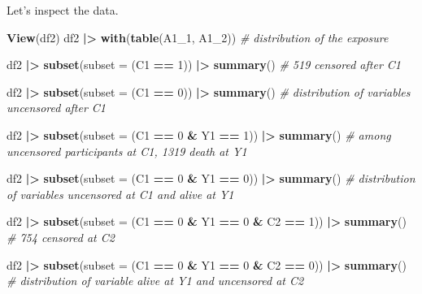 \documentclass[
]{book}
\newenvironment{Shaded}{\begin{snugshade}}{\end{snugshade}}
\newcommand{\AttributeTok}[1]{\textcolor[rgb]{0.13,0.29,0.53}{#1}}
\newcommand{\CommentTok}[1]{\textcolor[rgb]{0.56,0.35,0.01}{\textit{#1}}}
\newcommand{\DecValTok}[1]{\textcolor[rgb]{0.00,0.00,0.81}{#1}}
\newcommand{\FunctionTok}[1]{\textcolor[rgb]{0.13,0.29,0.53}{\textbf{#1}}}
\newcommand{\NormalTok}[1]{#1}
\newcommand{\SpecialCharTok}[1]{\textcolor[rgb]{0.81,0.36,0.00}{\textbf{#1}}}
\begin{document}
Let's inspect the data.

\begin{Shaded}
\begin{Highlighting}[]
\FunctionTok{View}\NormalTok{(df2)}
\NormalTok{df2 }\SpecialCharTok{|\textgreater{}} 
  \FunctionTok{with}\NormalTok{(}\FunctionTok{table}\NormalTok{(A1\_1, A1\_2)) }\CommentTok{\# distribution of the exposure}

\NormalTok{df2 }\SpecialCharTok{|\textgreater{}} 
  \FunctionTok{subset}\NormalTok{(}\AttributeTok{subset =}\NormalTok{ (C1 }\SpecialCharTok{==} \DecValTok{1}\NormalTok{)) }\SpecialCharTok{|\textgreater{}}
  \FunctionTok{summary}\NormalTok{() }\CommentTok{\# 519 censored after C1}

\NormalTok{df2 }\SpecialCharTok{|\textgreater{}} 
  \FunctionTok{subset}\NormalTok{(}\AttributeTok{subset =}\NormalTok{ (C1 }\SpecialCharTok{==} \DecValTok{0}\NormalTok{)) }\SpecialCharTok{|\textgreater{}}
  \FunctionTok{summary}\NormalTok{() }\CommentTok{\# distribution of variables uncensored after C1}

\NormalTok{df2 }\SpecialCharTok{|\textgreater{}} 
  \FunctionTok{subset}\NormalTok{(}\AttributeTok{subset =}\NormalTok{ (C1 }\SpecialCharTok{==} \DecValTok{0} \SpecialCharTok{\&}\NormalTok{ Y1 }\SpecialCharTok{==} \DecValTok{1}\NormalTok{)) }\SpecialCharTok{|\textgreater{}}
  \FunctionTok{summary}\NormalTok{() }\CommentTok{\# among uncensored participants at C1, 1319 death at Y1}

\NormalTok{df2 }\SpecialCharTok{|\textgreater{}} 
  \FunctionTok{subset}\NormalTok{(}\AttributeTok{subset =}\NormalTok{ (C1 }\SpecialCharTok{==} \DecValTok{0} \SpecialCharTok{\&}\NormalTok{ Y1 }\SpecialCharTok{==} \DecValTok{0}\NormalTok{)) }\SpecialCharTok{|\textgreater{}}
  \FunctionTok{summary}\NormalTok{() }\CommentTok{\# distribution of variables uncensored at C1 and alive at Y1}
            

\NormalTok{df2 }\SpecialCharTok{|\textgreater{}} 
  \FunctionTok{subset}\NormalTok{(}\AttributeTok{subset =}\NormalTok{ (C1 }\SpecialCharTok{==} \DecValTok{0} \SpecialCharTok{\&}\NormalTok{ Y1 }\SpecialCharTok{==} \DecValTok{0} \SpecialCharTok{\&}\NormalTok{ C2 }\SpecialCharTok{==} \DecValTok{1}\NormalTok{)) }\SpecialCharTok{|\textgreater{}}
  \FunctionTok{summary}\NormalTok{() }\CommentTok{\# 754 censored at C2}

\NormalTok{df2 }\SpecialCharTok{|\textgreater{}} 
  \FunctionTok{subset}\NormalTok{(}\AttributeTok{subset =}\NormalTok{ (C1 }\SpecialCharTok{==} \DecValTok{0} \SpecialCharTok{\&}\NormalTok{ Y1 }\SpecialCharTok{==} \DecValTok{0} \SpecialCharTok{\&}\NormalTok{ C2 }\SpecialCharTok{==} \DecValTok{0}\NormalTok{)) }\SpecialCharTok{|\textgreater{}}
  \FunctionTok{summary}\NormalTok{() }\CommentTok{\# distribution of variable alive at Y1 and uncensored at C2}


\end{Highlighting}
\end{Shaded}
\end{document}
